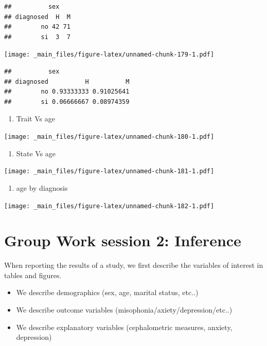 \documentclass[
]{book}
\providecommand{\tightlist}{%
  \setlength{\itemsep}{0pt}\setlength{\parskip}{0pt}}
\begin{document}
\begin{verbatim}
##          sex
## diagnosed  H  M
##        no 42 71
##        si  3  7
\end{verbatim}

\texttt{[image: \_main\_files/figure-latex/unnamed-chunk-179-1.pdf]}

\begin{verbatim}
##          sex
## diagnosed          H          M
##        no 0.93333333 0.91025641
##        si 0.06666667 0.08974359
\end{verbatim}

\begin{enumerate}
\def\labelenumi{\alph{enumi}.}
\setcounter{enumi}{7}
\tightlist
\item
  Trait Vs age
\end{enumerate}

\texttt{[image: \_main\_files/figure-latex/unnamed-chunk-180-1.pdf]}

\begin{enumerate}
\def\labelenumi{\roman{enumi}.}
\tightlist
\item
  State Vs age
\end{enumerate}

\texttt{[image: \_main\_files/figure-latex/unnamed-chunk-181-1.pdf]}

\begin{enumerate}
\def\labelenumi{\alph{enumi}.}
\setcounter{enumi}{9}
\tightlist
\item
  age by diagnosis
\end{enumerate}

\texttt{[image: \_main\_files/figure-latex/unnamed-chunk-182-1.pdf]}

\hypertarget{group-work-session-2-inference}{%
\section{Group Work session 2: Inference}\label{group-work-session-2-inference}}

When reporting the results of a study, we first describe the variables of interest in tables and figures.

\begin{itemize}
\tightlist
\item
  We describe demographics (sex, age, marital status, etc..)
\item
  We describe outcome variables (misophonia/axiety/depression/etc..)
\item
  We describe explanatory variables (cephalometric measures, anxiety, depression)
\end{itemize}
\end{document}
